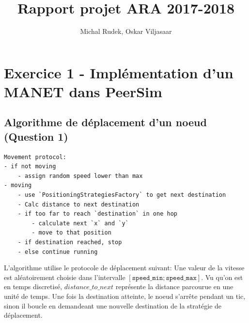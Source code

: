 \documentclass[a4paper]{article}
\title{Rapport projet ARA 2017-2018}
\author{Michal Rudek, Oskar Viljasaar}
\begin{document}
\maketitle


\tableofcontents
\pagebreak
\section{Exercice 1 - Implémentation d'un MANET dans PeerSim}
\subsection{Algorithme de déplacement d'un noeud (Question 1)}

\begin{verbatim}
Movement protocol:
- if not moving
    - assign random speed lower than max
- moving
    - use `PositioningStrategiesFactory` to get next destination
    - Calc distance to next destination
    - if too far to reach `destination` in one hop
        - calculate next `x` and `y`
        - move to that position
    - if destination reached, stop
    - else continue running
\end{verbatim}
L'algorithme utilise le protocole de déplacement suivant:
Une valeur de la vitesse est aléatoirement choisie dans l'intervalle
$ \left[ \texttt{speed\_min}; \texttt{speed\_max} \right] $.
Vu qu'on est en temps discretisé, $distance\_to\_next$ représente la
distance parcourue en une unité de temps.
Une fois la destination atteinte, le noeud s'arrête pendant un tic,
 sinon il boucle en demandeant une nouvelle destination de la
 stratégie de déplacement.
\end{document}
